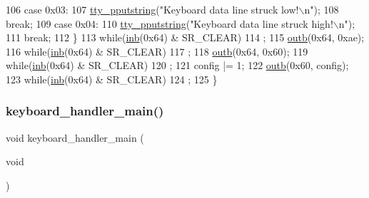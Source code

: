 \begin{DoxyCode}
106         \textcolor{keywordflow}{case} 0x03:
107             \hyperlink{a00173_ade960b1320324706aac6c00cc6b1b2fe_ade960b1320324706aac6c00cc6b1b2fe}{tty\_pputstring}(\textcolor{stringliteral}{"Keyboard data line struck low!\(\backslash\)n"});
108             \textcolor{keywordflow}{break};
109         \textcolor{keywordflow}{case} 0x04:
110             \hyperlink{a00173_ade960b1320324706aac6c00cc6b1b2fe_ade960b1320324706aac6c00cc6b1b2fe}{tty\_pputstring}(\textcolor{stringliteral}{"Keyboard data line struck high!\(\backslash\)n"});
111             \textcolor{keywordflow}{break};
112     \}
113     \textcolor{keywordflow}{while}(\hyperlink{a00158_a0223c8898dfec29069879dc51076e28a_a0223c8898dfec29069879dc51076e28a}{inb}(0x64) & SR\_CLEAR)
114         ;
115     \hyperlink{a00158_aa37f5841c54156a4b14fc0d6f626b44f_aa37f5841c54156a4b14fc0d6f626b44f}{outb}(0x64, 0xae);
116     \textcolor{keywordflow}{while}(\hyperlink{a00158_a0223c8898dfec29069879dc51076e28a_a0223c8898dfec29069879dc51076e28a}{inb}(0x64) & SR\_CLEAR)
117         ;
118     \hyperlink{a00158_aa37f5841c54156a4b14fc0d6f626b44f_aa37f5841c54156a4b14fc0d6f626b44f}{outb}(0x64, 0x60);
119     \textcolor{keywordflow}{while}(\hyperlink{a00158_a0223c8898dfec29069879dc51076e28a_a0223c8898dfec29069879dc51076e28a}{inb}(0x64) & SR\_CLEAR)
120         ;
121     config |= 1;
122     \hyperlink{a00158_aa37f5841c54156a4b14fc0d6f626b44f_aa37f5841c54156a4b14fc0d6f626b44f}{outb}(0x60, config);
123     \textcolor{keywordflow}{while}(\hyperlink{a00158_a0223c8898dfec29069879dc51076e28a_a0223c8898dfec29069879dc51076e28a}{inb}(0x64) & SR\_CLEAR)
124         ;
125 \}
\end{DoxyCode}
\mbox{\label{a00032_a1db933be72a0547c4070ba55e6697ba2_a1db933be72a0547c4070ba55e6697ba2}} 
\subsubsection{\texorpdfstring{keyboard\+\_\+handler\+\_\+main()}{keyboard\_handler\_main()}}
{\footnotesize\ttfamily void keyboard\+\_\+handler\+\_\+main (\begin{DoxyParamCaption}\item[{void}]{ }\end{DoxyParamCaption})}



